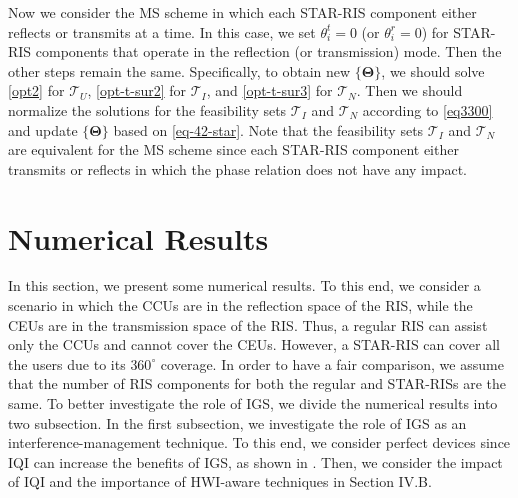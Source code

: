 \documentclass[a4, conference]{IEEEtran}
\theoremstyle{definition}
\begin{document}
Now we consider the MS scheme in which each STAR-RIS component either reflects or transmits at a time. In this case, we set ${\theta}_{i}^t=0$ (or ${\theta}_{i}^r=0$) for STAR-RIS components that operate in the reflection (or transmission) mode. Then the other steps remain the same. Specifically, to obtain new $\{\bm{\Theta}\}$, we should solve \eqref{opt2} for $\mathcal{T}_U$, \eqref{opt-t-sur2} for $\mathcal{T}_I$, and \eqref{opt-t-sur3} for $\mathcal{T}_N$. Then we should normalize the solutions for the feasibility sets $\mathcal{T}_I$ and $\mathcal{T}_N$ according to \eqref{eq3300} and update $\{\bm{\Theta}\}$ based on \eqref{eq-42-star}.
Note that the feasibility sets $\mathcal{T}_I$ and $\mathcal{T}_N$ are equivalent for the MS scheme since each STAR-RIS component either transmits or reflects in which the phase relation does not have any impact.


\section{Numerical Results}
In this section, we present some numerical results.
To this end, we consider a scenario in which the CCUs are in the reflection space of the RIS, while the CEUs are in the transmission space of the RIS. Thus, a regular RIS can assist only the CCUs and cannot cover the CEUs. 
However, a STAR-RIS can cover all the users due to its $360^{\circ}$ coverage. 
In order to have a fair comparison, we assume that the number of RIS components for both the regular and STAR-RISs are the same. To better investigate the role of IGS, we divide the numerical results into two subsection. In the first subsection, we investigate the role of IGS as an interference-management technique. To this end, we consider perfect devices since IQI can increase the benefits of IGS, as shown in \cite{soleymani2020improper, javed2019multiple}. Then, we consider the impact of IQI and the importance of HWI-aware techniques in Section IV.B.
\end{document}
